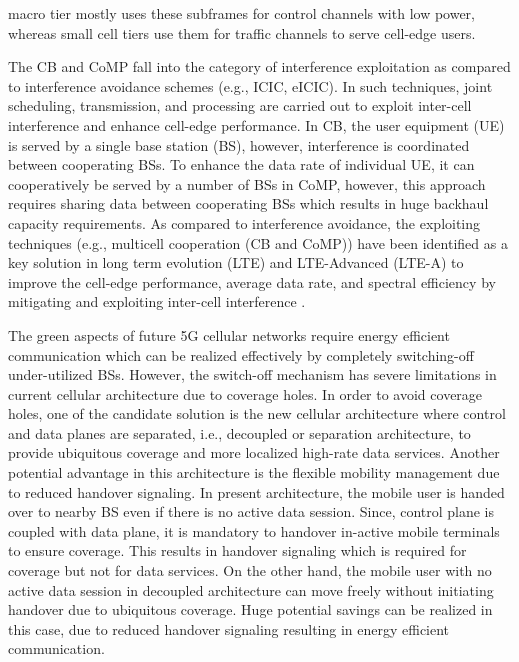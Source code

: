 \documentclass[article,10pt,twocolumn]{IEEEtran}
\begin{document}
macro tier mostly uses these subframes for control channels with low power, whereas small cell tiers use them for traffic channels to serve cell-edge users.

The CB and CoMP fall into the category of interference exploitation as compared to interference avoidance schemes (e.g., ICIC, eICIC). In such techniques, joint scheduling, transmission, and processing are carried out to exploit inter-cell interference and enhance cell-edge performance. In CB, the user equipment (UE) is served by a single base station (BS), however, interference is coordinated between cooperating BSs. To enhance the data rate of individual UE, it can cooperatively be served by a number of BSs in CoMP, however, this approach requires sharing data between cooperating BSs which results in huge backhaul capacity requirements. As compared to interference avoidance, the exploiting techniques (e.g., multicell cooperation (CB and CoMP)) have been identified as a key solution in long term evolution (LTE) and LTE-Advanced (LTE-A) to improve the cell-edge performance, average data rate, and spectral efficiency by mitigating and exploiting inter-cell interference \citep{3gpp.36.819, marsch_coordinated_2011, 4657145}.

The green aspects of future 5G cellular networks require energy efficient communication which can be realized effectively by completely switching-off under-utilized BSs. However, the switch-off mechanism has severe limitations in current cellular architecture due to coverage holes. In order to avoid coverage holes, one of the candidate solution is the new cellular architecture where control and data planes are separated, i.e., decoupled or separation architecture, to provide ubiquitous coverage and more localized high-rate data services. Another potential advantage in this architecture is the flexible mobility management due to reduced handover signaling. In present architecture, the mobile user is handed over to nearby BS even if there is no active data session. Since, control plane is coupled with data plane, it is mandatory to handover in-active mobile terminals to ensure coverage. This results in handover signaling which is required for coverage but not for data services. On the other hand, the mobile user with no active data session in decoupled architecture can move freely without initiating handover due to ubiquitous coverage. Huge potential savings can be realized in this case, due to reduced handover signaling resulting in energy efficient communication.
\end{document}
